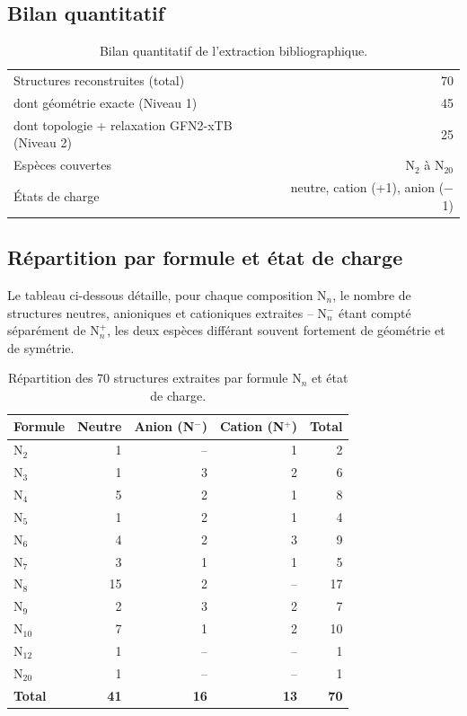 \documentclass[11pt,a4paper]{article}
\begin{document}
\subsection{Bilan quantitatif}

\begin{table}[H]
\centering
\begin{tabular}{lr}
\toprule
Structures reconstruites (total) & 70 \\
\quad dont g\'eom\'etrie exacte (Niveau 1) & 45 \\
\quad dont topologie + relaxation GFN2-xTB (Niveau 2) & 25 \\
Esp\`eces couvertes & N$_2$ \`a N$_{20}$ \\
\'Etats de charge & neutre, cation (+1), anion ($-$1) \\
\bottomrule
\end{tabular}
\caption{Bilan quantitatif de l'extraction bibliographique.}
\label{tab:bilan-quantitatif}
\end{table}

\subsection{R\'epartition par formule et \'etat de charge}

Le tableau ci-dessous d\'etaille, pour chaque composition N$_n$,
le nombre de structures neutres, anioniques et cationiques extraites --
N$_n^{-}$ \'etant compt\'e s\'epar\'ement de N$_n^{+}$, les deux esp\`eces
diff\'erant souvent fortement de g\'eom\'etrie et de sym\'etrie.

\begin{table}[H]
\centering
\begin{tabular}{lrrrr}
\toprule
Formule & Neutre & Anion (N$^{-}$) & Cation (N$^{+}$) & Total \\
\midrule
N$_2$    & 1  & --  & 1   & 2  \\
N$_3$    & 1  & 3   & 2   & 6  \\
N$_4$    & 5  & 2   & 1   & 8  \\
N$_5$    & 1  & 2   & 1   & 4  \\
N$_6$    & 4  & 2   & 3   & 9  \\
N$_7$    & 3  & 1   & 1   & 5  \\
N$_8$    & 15 & 2   & --  & 17 \\
N$_9$    & 2  & 3   & 2   & 7  \\
N$_{10}$ & 7  & 1   & 2   & 10 \\
N$_{12}$ & 1  & --  & --  & 1  \\
N$_{20}$ & 1  & --  & --  & 1  \\
\midrule
\textbf{Total} & \textbf{41} & \textbf{16} & \textbf{13} & \textbf{70} \\
\bottomrule
\end{tabular}
\caption{R\'epartition des 70 structures extraites par formule N$_n$ et
\'etat de charge.}
\label{tab:repartition-formule}
\end{table}
\end{document}
